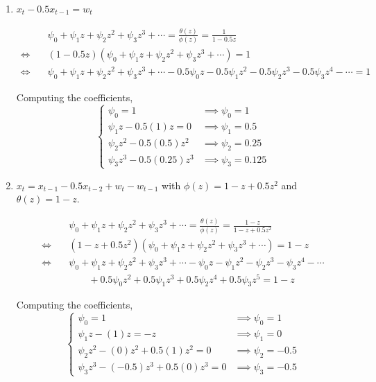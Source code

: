 \documentclass[12pt]{article}
\newcommand{\nl}{\vspace{0.1in}\noindent}
\begin{document}
\begin{enumerate}[label=(\alph*)]
    \item $x_t - 0.5x_{t-1} = w_t$ 
    
\begin{align*}
    & \psi_0 + \psi_1z + \psi_2z^2 + \psi_3z^3 + \cdots = \frac{\theta(z)}{\phi(z)} = \frac{1}{1-0.5z}\\
\iff \quad & (1-0.5z)(\psi_0 + \psi_1z + \psi_2z^2 + \psi_3z^3 + \cdots) = 1\\
\iff \quad &  \psi_0 + \psi_1z + \psi_2z^2 + \psi_3z^3 + \cdots - 0.5\psi_0 z -0.5 \psi_1z^2 -0.5 \psi_2z^3 -0.5 \psi_3z^4 - \cdots = 1
\end{align*}

\nl Computing the coefficients,
$$\begin{cases}
    \psi_0 = 1 & \implies \psi_0 = 1\\
    \psi_1 z - 0.5 (1) z = 0 & \implies \psi_1 = 0.5\\
    \psi_2 z^2 - 0.5(0.5)z^2 & \implies \psi_2 = 0.25\\
    \psi_3 z^3 - 0.5(0.25)z^3 & \implies \psi_3 = 0.125 
\end{cases}$$
\newpage
    \item $x_t = x_{t-1} - 0.5 x_{t-2} + w_t - w_{t-1}$ with $\phi(z) = 1 - z + 0.5z^2$ and $\theta(z) = 1 - z$.
    
    \begin{align*}
        & \psi_0 + \psi_1z + \psi_2z^2 + \psi_3z^3 + \cdots = \frac{\theta(z)}{\phi(z)} = \frac{1 - z}{1 - z + 0.5z^2}\\
    \iff \quad & (1 - z + 0.5z^2)(\psi_0 + \psi_1z + \psi_2z^2 + \psi_3z^3 + \cdots) = 1-z\\
    \iff \quad &  \psi_0 + \psi_1z + \psi_2z^2 + \psi_3z^3 + \cdots -\psi_0 z - \psi_1z^2 - \psi_2z^3 - \psi_3z^4 - \cdots\\ &\qquad + 0.5\psi_0z^2 + 0.5\psi_1z^3 + 0.5\psi_2z^4 + 0.5\psi_3z^5= 1 - z
    \end{align*}
    
    \nl Computing the coefficients,
    $$\begin{cases}
        \psi_0 = 1 & \implies \psi_0 = 1\\
        \psi_1 z - (1) z = -z & \implies \psi_1 = 0\\
        \psi_2 z^2 - (0)z^2 + 0.5(1)z^2 = 0 & \implies \psi_2 = -0.5\\
        \psi_3 z^3 - (-0.5)z^3 + 0.5(0)z^3 = 0& \implies \psi_3 = -0.5 
    \end{cases}$$
\end{enumerate}
\end{document}
